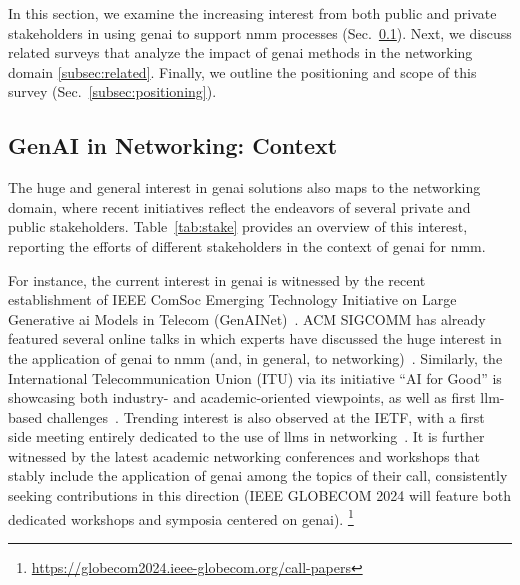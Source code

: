 

In this section, we examine the increasing interest from both public and private stakeholders in using \gls{genai} to support \gls{nmm} processes (Sec.~\ref{subsec:genai_context}). Next, we discuss related surveys that analyze the impact of \gls{genai} methods in the networking domain \ref{subsec:related}. Finally, we outline the positioning and scope of this survey
(Sec.~\ref{subsec:positioning}).

\subsection{GenAI in Networking: Context}
\label{subsec:genai_context}
The huge and general interest in \gls{genai} solutions also maps to the networking domain, where recent initiatives reflect the endeavors of several private and public stakeholders.
Table~\ref{tab:stake} provides an overview of this interest, reporting the efforts of different stakeholders in the context of \gls{genai} for \gls{nmm}.

For instance, the current interest in \gls{genai} is witnessed by the recent establishment of IEEE ComSoc Emerging Technology Initiative on Large Generative \gls{ai} Models in Telecom (GenAINet)~\cite{genainet}.
%
ACM 
SIGCOMM
has already featured several online talks
in which experts have discussed the huge interest in the application of \gls{genai} to \gls{nmm} (and, in general, to networking)~\cite{networkingchannel}.
%
Similarly, the International Telecommunication Union (ITU) via its initiative ``AI for Good'' is showcasing both industry- and academic-oriented viewpoints, as well as first \gls{llm}-based challenges~\cite{aiforgood}.
Trending interest is also observed at the IETF, with a first side meeting
entirely dedicated to the use of \glspl{llm} in networking~\cite{ietf}.
It is further witnessed by the latest academic networking conferences and workshops that stably include the application of \gls{genai} among the topics of their call, consistently seeking contributions in this direction (\eg IEEE GLOBECOM 2024 will feature both dedicated workshops and symposia centered on \gls{genai}).%
\footnote{\url{https://globecom2024.ieee-globecom.org/call-papers}}

